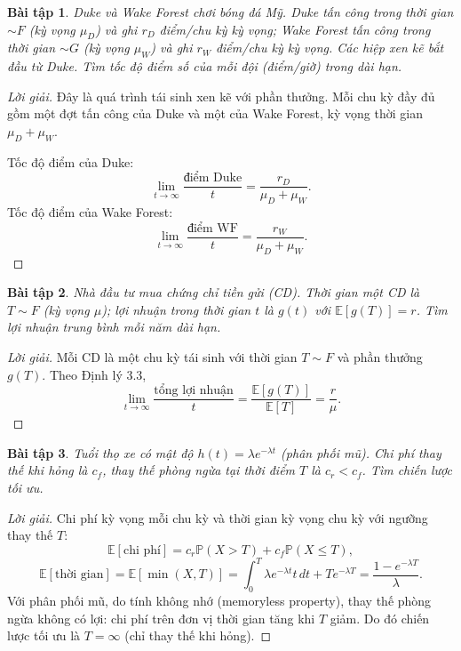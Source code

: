 \documentclass[8pt,a4paper]{article}
\newtheorem{exercise}{Bài tập}
\newenvironment{solution}{\begin{proof}[Lời giải]}{\end{proof}}
\newcommand{\prob}{\mathbb{P}}
\newcommand{\E}{\mathbb{E}}
\begin{document}
\begin{exercise}
Duke và Wake Forest chơi bóng đá Mỹ. Duke tấn công trong thời gian $\sim F$ (kỳ vọng $\mu_D$) và ghi $r_D$ điểm/chu kỳ kỳ vọng; Wake Forest tấn công trong thời gian $\sim G$ (kỳ vọng $\mu_W$) và ghi $r_W$ điểm/chu kỳ kỳ vọng. Các hiệp xen kẽ bắt đầu từ Duke. Tìm tốc độ điểm số của mỗi đội (điểm/giờ) trong dài hạn.
\end{exercise}
\begin{solution}
Đây là quá trình tái sinh xen kẽ với phần thưởng. Mỗi chu kỳ đầy đủ gồm một đợt tấn công của Duke và một của Wake Forest, kỳ vọng thời gian $\mu_D + \mu_W$.

Tốc độ điểm của Duke:
\[
  \lim_{t\to\infty} \frac{\text{điểm Duke}}{t} = \frac{r_D}{\mu_D + \mu_W}.
\]
Tốc độ điểm của Wake Forest:
\[
  \lim_{t\to\infty} \frac{\text{điểm WF}}{t} = \frac{r_W}{\mu_D + \mu_W}.
\]
\end{solution}

\begin{exercise}
Nhà đầu tư mua chứng chỉ tiền gửi (CD). Thời gian một CD là $T \sim F$ (kỳ vọng $\mu$); lợi nhuận trong thời gian $t$ là $g(t)$ với $\E[g(T)] = r$. Tìm lợi nhuận trung bình mỗi năm dài hạn.
\end{exercise}
\begin{solution}
Mỗi CD là một chu kỳ tái sinh với thời gian $T \sim F$ và phần thưởng $g(T)$. Theo Định lý 3.3,
\[
  \lim_{t\to\infty} \frac{\text{tổng lợi nhuận}}{t} = \frac{\E[g(T)]}{\E[T]} = \frac{r}{\mu}.
\]
\end{solution}

\begin{exercise}
Tuổi thọ xe có mật độ $h(t) = \lambda e^{-\lambda t}$ (phân phối mũ). Chi phí thay thế khi hỏng là $c_f$, thay thế phòng ngừa tại thời điểm $T$ là $c_r < c_f$. Tìm chiến lược tối ưu.
\end{exercise}
\begin{solution}
Chi phí kỳ vọng mỗi chu kỳ và thời gian kỳ vọng chu kỳ với ngưỡng thay thế $T$:
\[
  \E[\text{chi phí}] = c_r \prob(X > T) + c_f \prob(X \leq T),
\]
\[
  \E[\text{thời gian}] = \E[\min(X, T)] = \int_0^T \lambda e^{-\lambda t} t\, dt + T e^{-\lambda T} = \frac{1 - e^{-\lambda T}}{\lambda}.
\]
Với phân phối mũ, do tính không nhớ (memoryless property), thay thế phòng ngừa không có lợi: chi phí trên đơn vị thời gian tăng khi $T$ giảm. Do đó chiến lược tối ưu là $T = \infty$ (chỉ thay thế khi hỏng).
\end{solution}
\end{document}
